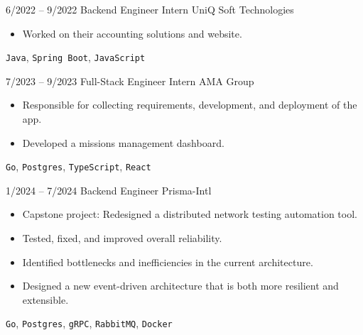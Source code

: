 \documentclass[9pt]{developercv} %
\begin{document}
\vspace{-10 pt}
\begin{entrylist}
    \entry
    {6/2022 -- 9/2022}
    {Backend Engineer Intern}
    {UniQ Soft Technologies}
    {\vspace{-10pt}
        \begin{itemize}[noitemsep,topsep=0pt,parsep=0pt,partopsep=0pt,leftmargin=-1pt]
            \item Worked on their accounting solutions and website.
        \end{itemize}
        \texttt{Java}, \texttt{Spring Boot}, \texttt{JavaScript}}
        
    \entry
    {7/2023 -- 9/2023}
    {Full-Stack Engineer Intern}
    {AMA Group}
    {\vspace{-10pt}
        \begin{itemize}[noitemsep,topsep=0pt,parsep=0pt,partopsep=0pt,leftmargin=-1pt]
            \item Responsible for collecting requirements, development, and deployment of the app.
            \item Developed a missions management dashboard.
        \end{itemize}
        \texttt{Go}, \texttt{Postgres}, \texttt{TypeScript}, \texttt{React}}
        
    \entry
    {1/2024 -- 7/2024}
    {Backend Engineer}
    {Prisma-Intl}
    {\vspace{-10pt}
        \begin{itemize}[noitemsep,topsep=0pt,parsep=0pt,partopsep=0pt,leftmargin=-1pt]
            \item Capstone project: Redesigned a distributed network testing automation tool.
            \item Tested, fixed, and improved overall reliability.
            \item Identified bottlenecks and inefficiencies in the current architecture.
            \item Designed a new event-driven architecture that is both more resilient and extensible.
        \end{itemize}
        \texttt{Go}, \texttt{Postgres}, \texttt{gRPC}, \texttt{RabbitMQ}, \texttt{Docker}}
        

\end{entrylist}
\end{document}
